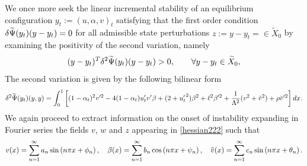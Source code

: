 We once more seek the linear incremental stability of an equilibrium configuration $y_t := (u, \alpha,  v)_t$ satisfying that the first order condition $\delta \widetilde\Psi(y_t)(y-y_t)=0$ for all admissible state perturbations $z:=y-y_t=\in\widetilde X_0$ by examining the positivity of the second variation, namely
\begin{equation*}
    (y-y_t)^T\delta^2 \widetilde\Psi(y_t)(y-y_t)>0, \qquad \forall y-y_t\in \widetilde X_0,
\end{equation*}The second variation is given by the following bilinear form 
\begin{equation}
\delta^2 \widetilde\Psi(y_t)(y, y)=\int_0^1 \left[(1-\alpha_t)^2v'^2 
- 4(1-\alpha_t)u_t' v'\beta+(2+ {u_t'}^2)\beta^2+\ell^2\beta'^2 +\frac{1}{\Lambda^2}( v^2 + \tilde v^2)+\rho \tilde v'^2\right]dx.\label{hessian222}\end{equation}
We again proceed to extract information on the onset of instability expanding in Fourier series the fields $v$, $w$ and $z$ appearing in \eqref{hessian222} such that 
\[
v(x) = \sum_{n=1}^{\infty} a_{n} \sin \left(n \pi x + \phi_{n}\right),
\quad \beta(x) = \sum_{n=1}^{\infty} b_{n} \cos \left(n \pi x + \psi_{n}\right),
\quad \tilde v(x) = \sum_{n=1}^{\infty} c_{n} \sin \left(n \pi x + \theta_{n}\right).
\]

